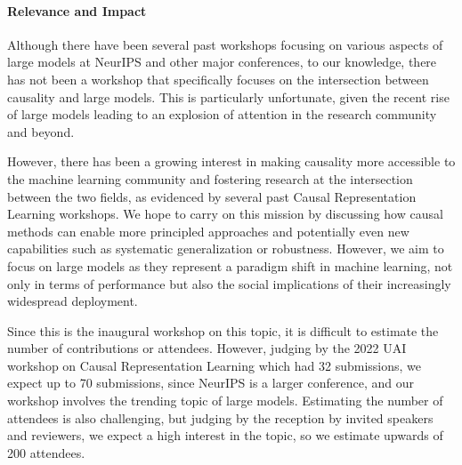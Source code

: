 \documentclass{article}
\begin{document}





\paragraph{Relevance and Impact}

Although there have been several past workshops focusing on various aspects of large models at NeurIPS and other major conferences, to our knowledge, there has not been a workshop that specifically focuses on the intersection between causality and large models.
This is particularly unfortunate, given the recent rise of large models leading to an explosion of attention in the research community and beyond. 

However, there has been a growing interest in making causality more accessible to the machine learning community and fostering research at the intersection between the two fields, as evidenced by several past Causal Representation Learning workshops. We hope to carry on this mission by discussing how causal methods can enable more principled approaches and potentially even new capabilities such as systematic generalization or robustness. However, we aim to focus on large models as they represent a paradigm shift in machine learning, not only in terms of performance but also the social implications of their increasingly widespread deployment.

Since this is the inaugural workshop on this topic, it is difficult to estimate the number of contributions or attendees. However, judging by the 2022 UAI workshop on Causal Representation Learning which had 32 submissions, we expect up to 70 submissions, since NeurIPS is a larger conference, and our workshop involves the trending topic of large models. Estimating the number of attendees is also challenging, but judging by the reception by invited speakers and reviewers, we expect a high interest in the topic, so we estimate upwards of 200 attendees.

\end{document}
